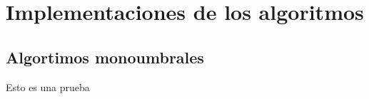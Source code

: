 \chapter{Implementaciones de los algoritmos}

\section{Algortimos monoumbrales}

\begin{listing}\label{cod:alg1}
    \caption{Esto es una prueba}
\end{listing}